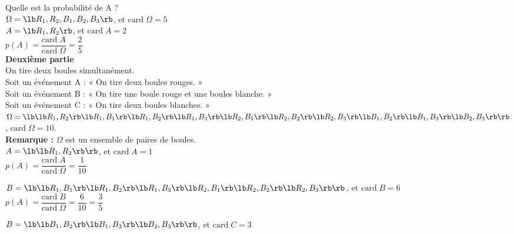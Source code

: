 Quelle est la probabilité de A ? \\

$ \Omega = \lb R_1, R_2, B_1, B_2, B_3 \rb $, et $\mathrm{card} \; \Omega = 5 $ \\

$ A = \lb R_1, R_2 \rb $, et $ \mathrm{card} \; A = 2 $ \\

$ p\left(A\right) = \dfrac{\mathrm{card} \; A}{\mathrm{card} \; \Omega} = \dfrac{2}{5} $ \\

\textbf{Deuxième partie} \\

On tire deux boules simultanément. \\ Soit un événement A : « On tire deux boules rouges. » \\Soit un événement B : « On tire une boule rouge et une boules blanche. » \\Soit un événement C : « On tire deux boules blanches. » \\

$\Omega = \lb \lb R_1,R_2 \rb \lb R_1,B_1 \rb \lb R_1,B_2 \rb \lb R_1,B_3 \rb \lb R_2,B_1 \rb \lb R_2,B_2 \rb \lb R_2,B_3 \rb \lb B_1,B_2 \rb \lb B_1,B_3 \rb \lb B_2,B_3 \rb \rb  $, $\mathrm{card} \; \Omega = 10 $. \\

\textbf{Remarque :} $\Omega$ est un ensemble de paires de boules. \\

$A = \lb \lb R_1, R_2 \rb \rb $, et $\mathrm{card} \; A = 1 $ \\

$ p\left(A\right) = \dfrac{\mathrm{card} \; A}{\mathrm{card} \; \Omega} = \dfrac{1}{10}$ \\

\vspace*{.3cm}

$B = \lb \lb R_1, B_1 \rb \lb R_1, B_2 \rb\lb R_1, B_3 \rb\lb R_2, B_1 \rb \lb R_2, B_2 \rb \lb R_2, B_3 \rb \rb $, et $\mathrm{card} \; B = 6 $ \\

$ p\left(A\right) = \dfrac{\mathrm{card} \; B}{\mathrm{card} \; \Omega} = \dfrac{6}{10} = \dfrac{3}{5}$ \\

\vspace*{.3cm}

$B = \lb  \lb B_1, B_2 \rb \lb B_1, B_3 \rb \lb B_2, B_3 \rb \rb $, et $\mathrm{card} \; C = 3 $ \\

